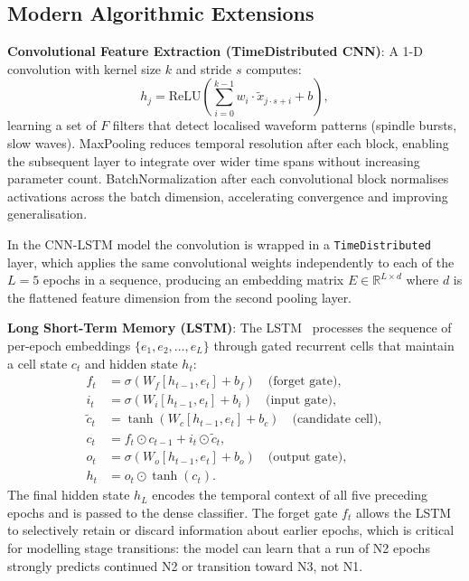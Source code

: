 \documentclass[10pt]{article}
\begin{document}
\subsection{Modern Algorithmic Extensions}
\label{sec:modernAlgo}

\textbf{Convolutional Feature Extraction (TimeDistributed CNN)}: A 1-D convolution with kernel size $k$ and stride $s$ computes:
\begin{equation}
  h_j = \text{ReLU}\!\left(\sum_{i=0}^{k-1} w_i \cdot \tilde{x}_{j \cdot s + i} + b\right),
\end{equation}
learning a set of $F$ filters that detect localised waveform patterns (spindle bursts, slow waves). MaxPooling reduces temporal resolution after each block, enabling the subsequent layer to integrate over wider time spans without increasing parameter count. BatchNormalization after each convolutional block normalises activations across the batch dimension, accelerating convergence and improving generalisation.

In the CNN-LSTM model the convolution is wrapped in a \texttt{TimeDistributed} layer, which applies the same convolutional weights independently to each of the $L=5$ epochs in a sequence, producing an embedding matrix $E \in \mathbb{R}^{L \times d}$ where $d$ is the flattened feature dimension from the second pooling layer.

\textbf{Long Short-Term Memory (LSTM)}: The LSTM~\cite{hochreiter1997long} processes the sequence of per-epoch embeddings $\{e_1, e_2, \ldots, e_L\}$ through gated recurrent cells that maintain a cell state $c_t$ and hidden state $h_t$:
\begin{align}
  f_t &= \sigma(W_f [h_{t-1}, e_t] + b_f) \quad \text{(forget gate)},\\
  i_t &= \sigma(W_i [h_{t-1}, e_t] + b_i) \quad \text{(input gate)},\\
  \tilde{c}_t &= \tanh(W_c [h_{t-1}, e_t] + b_c) \quad \text{(candidate cell)},\\
  c_t &= f_t \odot c_{t-1} + i_t \odot \tilde{c}_t,\\
  o_t &= \sigma(W_o [h_{t-1}, e_t] + b_o) \quad \text{(output gate)},\\
  h_t &= o_t \odot \tanh(c_t).
\end{align}
The final hidden state $h_L$ encodes the temporal context of all five preceding epochs and is passed to the dense classifier. The forget gate $f_t$ allows the LSTM to selectively retain or discard information about earlier epochs, which is critical for modelling stage transitions: the model can learn that a run of N2 epochs strongly predicts continued N2 or transition toward N3, not N1.
\end{document}
